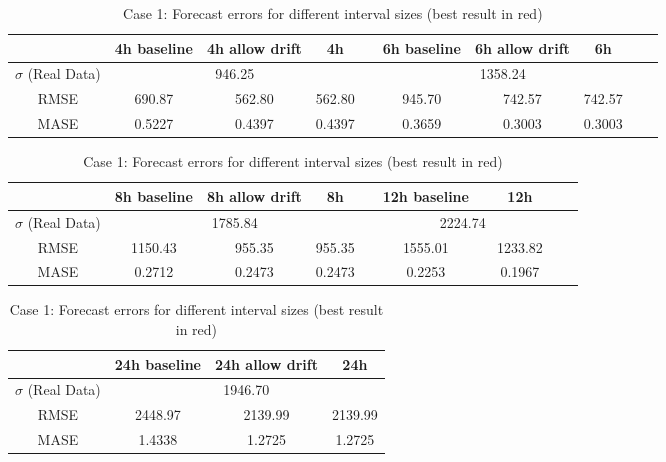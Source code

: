 \begin{table}[!ht]
\footnotesize
\begin{tabular}{c|ccccccccc}
              & 4h baseline & 4h allow drift & 4h     &  & 6h baseline & 6h allow drift & 6h     &  &  \\ \hline
$\sigma$ (Real Data) & \multicolumn{3}{c}{946.25}           &  & \multicolumn{3}{c}{1358.24}           &  &  \\
RMSE          & 690.87      & 562.80         & 562.80 &  & 945.70      & 742.57         & 742.57 &  &  \\
MASE          & 0.5227      & 0.4397         & 0.4397 &  & 0.3659      & 0.3003         & 0.3003 &  & 
\end{tabular}

\vspace{0.5cm}

\begin{tabular}{c|ccccccccc}
              & 8h baseline & 8h allow drift & 8h     &  & 12h baseline & \color{red}{12h allow drift} & 12h     &  &  \\ \hline
$\sigma$ (Real Data) & \multicolumn{3}{c}{1785.84}           &  & \multicolumn{3}{c}{2224.74}           &  &  \\
RMSE          & 1150.43     & 955.35         & 955.35 &  & 1555.01     & \color{red}{1233.82}     & 1233.82 &  &  \\
MASE          & 0.2712      & 0.2473         & 0.2473 &  & 0.2253      & \color{red}{0.1967}      & 0.1967 &  & 
\end{tabular}

\vspace{0.5cm}

\begin{tabular}{c|ccc}
              & 24h baseline & 24h allow drift & 24h  \\ \hline
$\sigma$ (Real Data) & \multicolumn{3}{c}{1946.70}     \\
RMSE          & 2448.97     & 2139.99        & 2139.99   \\
MASE          & 1.4338      & 1.2725         & 1.2725 \\
\end{tabular}

\vspace{0.5cm}

\caption{Case 1: Forecast errors for different interval sizes (best result in
red)}\label{tab:case1_interval}
\end{table}




